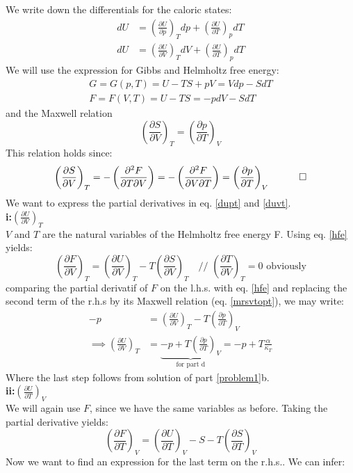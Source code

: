 \documentclass[a4paper]{article}
\newcommand{\pd}[3]{\left(\frac{\partial {#1}}{\partial {#2}}\right)_{#3}}
\newcommand{\pdd}[3]{\left(\frac{\partial^2 {#1}}{\partial {#2}\partial {#3}}\right)}
\begin{document}
We write down the differentials for the caloric states:
\begin{align}
    dU&=\pd{U}{p}{T}dp+\pd{U}{T}{p}dT \label{dupt}\\
    dU&=\pd{U}{V}{T}dV+\pd{U}{T}{p}dT \label{duvt}
\end{align}
We will use the expression for Gibbs and Helmholtz free energy:
\begin{align}
    G=G(p,T)=U-TS+pV=Vdp-SdT \label{gfe} \\
    F=F(V,T)=U-TS=-pdV-SdT \label{hfe}
\end{align}
and the Maxwell relation    
\begin{equation}
    \pd{S}{V}{T} = \pd{p}{T}{V} \label{mrsvtopt}
\end{equation}
This relation holds since:
\begin{equation}
    \pd{S}{V}{T}=-\pdd{F}{T}{V}=-\pdd{F}{V}{T}=\pd{p}{T}{V} \quad \qed
\end{equation}
We want to express the partial derivatives in eq. \ref{dupt} and \ref{duvt}. 
\\${}$\\
\textbf{i:}$\pd{U}{V}{T}$
\\${}$\\
$V$ and $T$ are the natural variables of the Helmholtz free energy F. Using eq. \ref{hfe} yields:
\begin{equation}
    \pd{F}{V}{T}=\pd{U}{V}{T}-T\pd{S}{V}{T} \quad \text{// $\pd{T}{V}{T}=0$ obviously}
\end{equation}
comparing the partial derivatif of $F$ on the l.h.s. with eq. \ref{hfe} and replacing the second term of the r.h.s by its Maxwell relation (eq. \ref{mrsvtopt}), we may write:
\begin{align}
    -p &= \pd{U}{V}{T}-T\pd{p}{T}{V} \\
    \implies \pd{U}{V}{T}&=\underbrace{-p+T\pd{p}{T}{V}}_{\text{for part d}}=-p+T\frac{\alpha}{\kappa_T} \label{pduvt}
\end{align}
Where the last step follows from solution of part \ref{problem1}b.
\\${}$\\
\textbf{ii:}$\pd{U}{T}{V}$
\\${}$\\
We will again use $F$, since we have the same variables as before. Taking the partial derivative yields:
\begin{equation}
    \pd{F}{T}{V}=\pd{U}{T}{V}-S-T\pd{S}{T}{V}
\end{equation}
Now we want to find an expression for the last term on the r.h.s.. We can infer:
\end{document}
